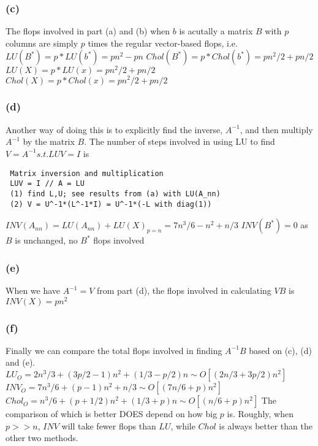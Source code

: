 \documentclass{article}
\begin{document}
\subsubsection*{(c)}
The flops involved in part (a) and (b) when $b$ is acutally a matrix $B$ with $p$ columns are
simply $p$ times the regular vector-based flops, i.e.
\newline
$LU(B^*)  = p*LU(b^*) = pn^2 - pn$
\newline
$Chol(B^*) = p*Chol(b^*)  = pn^2/2 + pn/2$
\newline
\hbox{}
\newline
$LU(X) = p*LU(x) = pn^2/2 + pn/2$
\newline
$Chol(X) = p*Chol(x) = pn^2/2 + pn/2$

\subsubsection*{(d)}
Another way of doing this is to explicitly find the inverse, $A^{-1}$, and then multiply
$A^{-1}$ by the matrix $B$. The number of steps involved in using LU to find 
$V=A^{-1}  s.t.  LUV = I$ is
\begin{lstlisting}
 Matrix inversion and multiplication
 LUV = I // A = LU
 (1) find L,U; see results from (a) with LU(A_nn)
 (2) V = U^-1*(L^-1*I) = U^-1*(-L with diag(1))
\end{lstlisting}
$INV(A_{nn}) = LU(A_{nn}) + LU(X)_{p=n} = 7n^3/6 - n^2 + n/3$
\newline
$INV(B^*)  = 0 $ \hspace{18 pt} as $B$ is unchanged, no $B^*$ flops involved

\subsubsection*{(e)}
When we have $A^{-1}=V$ from part (d), the flops involved in calculating $VB$ is \newline
$INV(X) = pn^2$

\subsubsection*{(f)}
Finally we can compare the total flops involved in finding $A^{-1}B$ based on (c), (d) and (e).
\newline
$LU_O   = 2n^3/3 + (3p/2-1)n^2 + (1/3-p/2)n \sim O[(2n/3+3p/2)n^2]$
\newline
$INV_O  = 7n^3/6 + (p-1)n^2 + n/3 \sim O[(7n/6+p)n^2]$
\newline
$Chol_O = n^3/6 + (p+1/2)n^2 + (1/3+p)n \sim O[(n/6+p)n^2]$
\newline
\hbox{}
\newline
The comparison of which is better DOES depend on how big $p$ is. Roughly, when $p>>n$, $INV$ will
take fewer flops than $LU$, while $Chol$ is always better than the other two methods.
\end{document}
